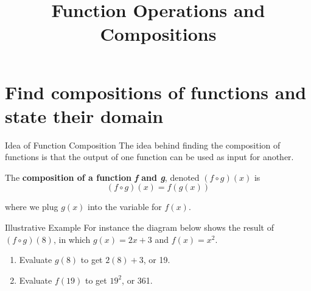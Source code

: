 \documentclass[t,usenames,dvipsnames]{beamer}
\title{Function Operations and Compositions}
\author{}
\date{}
\begin{document}
\begin{frame}
    \titlepage
\end{frame}

\section{Find compositions of functions and state their domain}

\begin{frame}{Idea of Function Composition}
The idea behind finding the composition of functions is that the output of one function can be used as input for another.   \newline\\  \pause

The \textbf{composition of a function \textit{f} and \textit{g}}, denoted $(f \circ g)(x)$ is
\[  (f \circ g)(x) = f(g(x))    \] 

where we plug $g(x)$ into the variable for $f(x)$.
\end{frame}

\begin{frame}{Illustrative Example}
For instance the diagram below shows the result of $(f \circ g)(8)$, in which $g(x)=2x+3$ and $f(x)=x^2$. \newline\\  \pause
\begin{enumerate}
    \item Evaluate $g(8)$ to get $2(8) + 3$, or 19. \newline\\  \pause
    \item Evaluate $f(19)$ to get $19^2$, or 361. \newline\\  \pause
\end{enumerate}

\begin{center}
\end{center}    
\end{frame}
\end{document}
